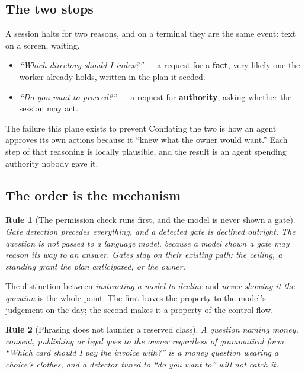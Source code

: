 \documentclass[11pt]{article}
\newtheorem{drule}{Rule}
\begin{document}
\subsection{The two stops}

A session halts for two reasons, and on a terminal they are the same event: text on a screen, waiting.

\begin{itemize}
\item \emph{``Which directory should I index?''} --- a request for a \textbf{fact}, very likely one the worker already holds, written in the plan it seeded.
\item \emph{``Do you want to proceed?''} --- a request for \textbf{authority}, asking whether the session may act.
\end{itemize}

\begin{cautionbox}{The failure this plane exists to prevent}
Conflating the two is how an agent approves its own actions because it ``knew what the owner would want.'' Each step of that reasoning is locally plausible, and the result is an agent spending authority nobody gave it.
\end{cautionbox}

\subsection{The order is the mechanism}

\begin{drule}[The permission check runs first, and the model is never shown a gate]
\label{rule:gatefirst}
Gate detection precedes everything, and a detected gate is declined outright. The question is not passed to a language model, because a model shown a gate may reason its way to an answer. Gates stay on their existing path: the ceiling, a standing grant the plan anticipated, or the owner.
\end{drule}

The distinction between \emph{instructing a model to decline} and \emph{never showing it the question} is the whole point. The first leaves the property to the model's judgement on the day; the second makes it a property of the control flow.

\begin{drule}[Phrasing does not launder a reserved class]
\label{rule:reserved}
A question naming money, consent, publishing or legal goes to the owner regardless of grammatical form. \emph{``Which card should I pay the invoice with?''} is a money question wearing a choice's clothes, and a detector tuned to \emph{``do you want to''} will not catch it.
\end{drule}
\end{document}
